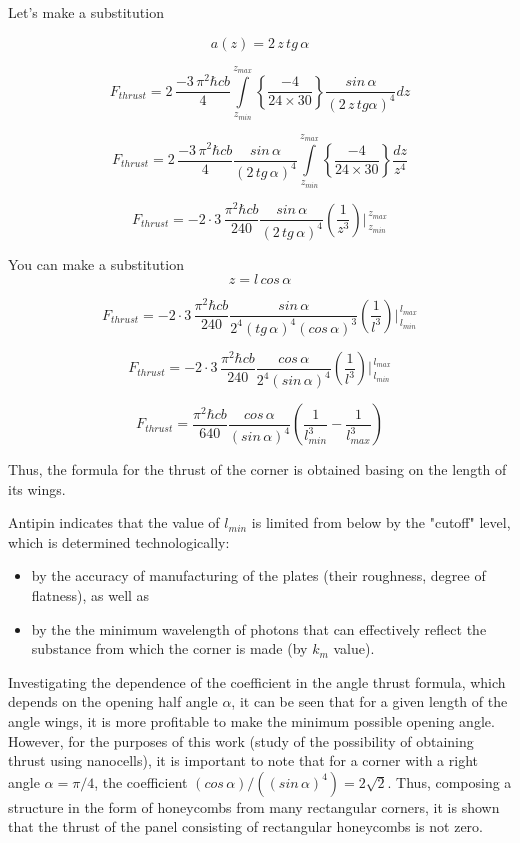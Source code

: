 \documentclass[twoside, 10pt]{article}
\begin{document}
\begin{multicols}{2}
Let's make a substitution

\[a\left(z\right) = 2\,z\,tg\, \alpha\]

\[F_{thrust} = 2\, \frac{-3\,\pi^2\hbar c b}{4}\int\limits_{z_{min}}^{z_{max}} \left\{\frac{-4}{24\times30}\right\}\frac{sin\, \alpha}{\left(2\,z\,tg \alpha\right)^4}dz\]

\[F_{thrust} = 2\, \frac{-3\,\pi^2\hbar c b}{4} \frac{sin\, \alpha}{\left(2\,tg\, \alpha\right)^4} \int\limits_{z_{min}}^{z_{max}} \left\{\frac{-4}{24\times30}\right\} \frac{dz}{z^4}\]

\[F_{thrust} = -2\cdot3\, \frac{\pi^2\hbar c b}{240} \frac{sin\, \alpha}{\left(2\,tg\, \alpha\right)^4} \left(\frac{1}{z^3}\right)\Bigg\rvert_{\,z_{min}}^{\,z_{max}} \]

    You can make a substitution \[z = l\, cos\, \alpha\]

\[F_{thrust} = -2\cdot3\, \frac{\pi^2\hbar c b}{240} \frac{sin\, \alpha}{2^4\left(tg\,\alpha\right)^4\left(cos\, \alpha\right)^3} \left(\frac{1}{l^3}\right)\Bigg\rvert_{\,l_{min}}^{\,l_{max}} \]

\[F_{thrust} = -2\cdot3\, \frac{\pi^2\hbar c b}{240} \frac{cos\, \alpha}{2^4\left(sin\, \alpha\right)^4} \left(\frac{1}{l^3}\right)\Bigg\rvert_{\,l_{min}}^{\,l_{max}} \]

\[F_{thrust} = \frac{\pi^2\hbar c b}{640} \frac{cos\, \alpha}{\left(sin\, \alpha\right)^4} \left(\frac{1}{l_{min}^3} - \frac{1}{l_{max}^3}\right)\]

Thus, the formula for the thrust of the corner is obtained basing on the
length of its wings.

Antipin indicates that the value of \(l_{min}\) is limited from below by
the "cutoff" level, which is determined technologically:

\begin{itemize}
\item
  by the accuracy of manufacturing of the plates (their roughness,
  degree of flatness), as well as
\item
  by the the minimum wavelength of photons that can effectively reflect
  the substance from which the corner is made (by \(k_m\) value).
\end{itemize}

    Investigating the dependence of the coefficient in the angle thrust
formula, which depends on the opening half angle \(\alpha\), it can be
seen that for a given length of the angle wings, it is more profitable
to make the minimum possible opening angle. However, for the purposes of
this work (study of the possibility of obtaining thrust using
nanocells), it is important to note that for a corner with a right angle
\(\alpha = {\pi}/{4}\), the coefficient
\(\left({cos\, \alpha}\right)\big/\left({\left(sin\, \alpha\right)^4}\right) = 2\sqrt{2}\).
Thus, composing a structure in the form of honeycombs from many
rectangular corners, it is shown that the thrust of the panel consisting
of rectangular honeycombs is not zero.


\end{multicols}
\end{document}
